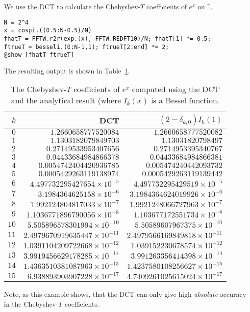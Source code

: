 \begin{example}\label{Example:DCT}
We use the DCT to calculate the Chebyshev-$T$ coefficients of $e^x$ on $\mathbb{I}$.
\begin{verbatim}
N = 2^4
x = cospi.((0.5:N-0.5)/N)
fhatT = FFTW.r2r(exp.(x), FFTW.REDFT10)/N; fhatT[1] *= 0.5;
ftrueT = besseli.(0:N-1,1); ftrueT[2:end] *= 2;
@show [fhatT ftrueT]
\end{verbatim}
The resulting output is shown in Table~\ref{table:ChebyshevTExponential}.
\begin{table}[htp]
\caption{The Chebyshev-$T$ coefficients of $e^x$ computed using the DCT and the analytical result (where $I_k(x)$ is a Bessel function.}
\begin{center}
\begin{tabular}{rrr}
\hline
$k$ & DCT & $(2-\delta_{k,0})I_k(1)$\\
\hline
$0$ & $1.2660658777520084$ & $1.2660658777520082$\\
$1$ & $1.1303182079849703$ & $1.13031820798497$\\
$2$ & $0.27149533953407656$ & $0.2714953395340767$\\
$3$ & $0.04433684984866378$ & $0.04433684984866381$\\
$4$ & $0.0054742404420936785$ & $0.005474240442093732$\\
$5$ & $0.0005429263119138974$ & $0.0005429263119139442$\\
$6$ & $4.497732295427654\times10^{-5}$ & $4.497732295429519\times10^{-5}$\\
$7$ & $3.1984364625158\times10^{-6}$ & $3.1984364624019926\times10^{-6}$\\
$8$ & $1.992124804817033\times10^{-7}$ & $1.9921248066727963\times10^{-7}$\\
$9$ & $1.1036771896790056\times10^{-8}$ & $1.103677172551734\times10^{-8}$\\
$10$ & $5.505896578301994\times10^{-10}$ & $5.50589607967375\times10^{-10}$\\
$11$ & $2.4979670919635447\times10^{-11}$ & $2.4979566169849818\times10^{-11}$\\
$12$ & $1.0391104209722668\times10^{-12}$ & $1.039152230678574\times10^{-12}$\\
$13$ & $3.9919456629178285\times10^{-14}$ & $3.991263356414398\times10^{-14}$\\
$14$ & $1.4363510381087963\times10^{-15}$ & $1.4237580108256627\times10^{-15}$\\
$15$ & $6.938893903907228\times10^{-17}$ & $4.7409261025615024\times10^{-17}$\\
\hline
\end{tabular}
\end{center}
\label{table:ChebyshevTExponential}
\end{table}%
Note, as this example shows, that the DCT can only give high {\em absolute} accuracy in the Chebyshev-$T$ coefficients.
\end{example}

